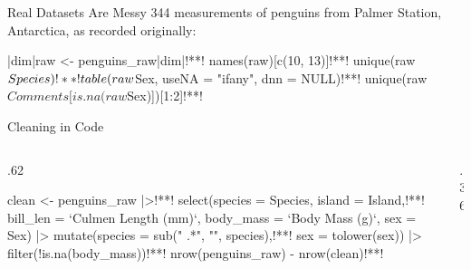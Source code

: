 \begin{frame}[fragile,label=messy-data]{Real Datasets Are Messy}
344 measurements of penguins from Palmer Station, Antarctica,\supercite{horst2020palmerpenguins} as recorded originally:\\[2mm]
\begin{minipage}{.6\textwidth}
\scriptsize
\begin{rsession}
|dim|raw <- penguins_raw|dim|!**!
names(raw)[c(10, 13)]!**!
unique(raw$Species)!*\CodeMark{sp}*!
table(raw$Sex, useNA = "ifany", dnn = NULL)!**!
unique(raw$Comments[is.na(raw$Sex)])[1:2]!**!
\end{rsession}
\end{minipage}
\end{frame}

\begin{frame}[fragile]{Cleaning in Code}
\begin{columns}[c,onlytextwidth]
   \begin{column}{.62\textwidth}
\scriptsize
\begin{rsession}
clean <- penguins_raw |>!**!
  select(species = Species, island = Island,!**!
         bill_len = `Culmen Length (mm)`,
         body_mass = `Body Mass (g)`, sex = Sex) |>
  mutate(species = sub(" .*", "", species),!**!
         sex = tolower(sex)) |>
  filter(!is.na(body_mass))!**!
nrow(penguins_raw) - nrow(clean)!**!
\end{rsession}
   \end{column}
   \begin{column}{.36\textwidth}
   \end{column}
\end{columns}
\end{frame}

